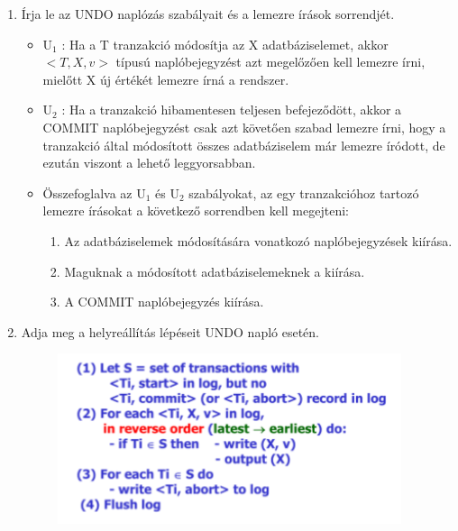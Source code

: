 \documentclass[a4paper,11.5pt, table]{article}
\begin{document}
\begin{enumerate}
	
	\item Írja le az UNDO naplózás szabályait és a lemezre írások sorrendjét.
		\begin{itemize}
			\item U$_{1}$ : Ha a T tranzakció módosítja az X adatbáziselemet, akkor $<T, X, v>$ típusú naplóbejegyzést azt megelőzően kell lemezre írni, mielőtt X új értékét lemezre írná a rendszer.
			\item U$_{2}$ : Ha a tranzakció hibamentesen teljesen befejeződött, akkor a COMMIT naplóbejegyzést csak azt követően szabad lemezre írni, hogy a tranzakció által módosított összes adatbáziselem már lemezre íródott, de ezután viszont a lehető leggyorsabban.
			\item Összefoglalva az U$_{1}$ és U$_{2}$ szabályokat, az egy tranzakcióhoz tartozó lemezre írásokat a következő sorrendben kell megejteni:
			\begin{enumerate}
				\item Az adatbáziselemek módosítására vonatkozó naplóbejegyzések kiírása.
				\item Maguknak a módosított adatbáziselemeknek a kiírása.
				\item A COMMIT naplóbejegyzés kiírása.
			\end{enumerate}
		\end{itemize}
	
	\item Adja meg a helyreállítás lépéseit UNDO napló esetén.
		
		\begin{figure}[h]
			\centering
			\includegraphics[height = 5cm]{undo.png}
		\end{figure}


\end{enumerate}
\end{document}
